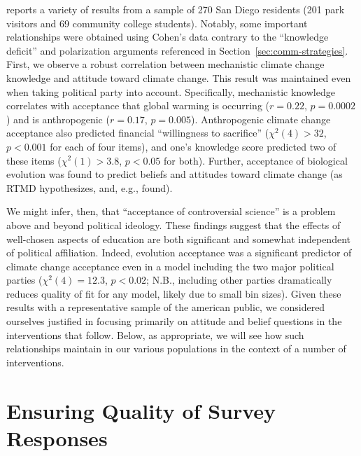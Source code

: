 \textcite{cohen_san_2012_f} reports a variety of results from a sample of 270
San Diego residents (201 park visitors and 69 community college students).
Notably, some important relationships were obtained using Cohen’s data contrary
to the “knowledge deficit” and polarization arguments referenced in
Section~\ref{sec:comm-strategies}. First, we observe a robust correlation
between mechanistic climate change knowledge and attitude toward climate change.
This result was maintained even when taking political party into account.
Specifically, mechanistic knowledge correlates with acceptance that global
warming is occurring ($r=0.22$, $p=0.0002$) and is anthropogenic ($r=0.17$,
$p=0.005$).  Anthropogenic climate change acceptance also predicted financial
“willingness to sacrifice” ($χ^2(4) > 32$, $p<0.001$ for each of four items),
and one’s knowledge score predicted two of these items ($χ^2(1) > 3.8$, $p<0.05$
for both). Further, acceptance of biological evolution was found to predict
beliefs and attitudes toward climate change (as RTMD hypothesizes, and, e.g.,
\cite{ranney_why_2012} found). 

We might infer, then, that “acceptance of controversial science” is a problem
above and beyond political ideology. These findings suggest that the effects of
well-chosen aspects of education are both significant and somewhat independent
of political affiliation. Indeed, evolution acceptance was a significant
predictor of climate change acceptance even in a model including the two major
political parties ($\chi^2(4)=12.3$, $p<0.02$; N.B., including other parties
dramatically reduces quality of fit for any model, likely due to small bin
sizes). Given these results with a representative sample of the american public,
we considered ourselves justified in focusing primarily on attitude and belief
questions in the interventions that follow.  
Below, as appropriate, we will see how such relationships maintain
in our various populations in the context of a number of interventions.

% 

\section{Ensuring Quality of Survey Responses}
\label{sec:attitude-quality}

